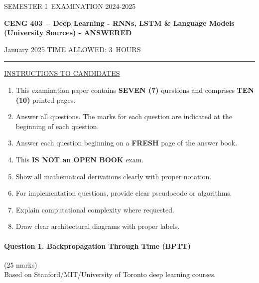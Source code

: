 \documentclass[12pt]{article}
\newcommand{\masunitnumber}{CENG 403}
\newcommand{\examdate}{January 2025}
\newcommand{\academicyear}{2024-2025}
\newcommand{\semester}{I}
\newcommand{\coursename}{Deep Learning - RNNs, LSTM \& Language Models (University Sources) - ANSWERED}
\newcommand{\numberofhours}{3}
\begin{document}
\setlength{\headsep}{5truemm}
\setlength{\headheight}{14.5truemm}
\setlength{\voffset}{-0.45truein}
\renewcommand{\headrulewidth}{0.0pt}
\begin{center}
SEMESTER \semester\ EXAMINATION \academicyear
\end{center}
\begin{center}
{\bf \masunitnumber\ -- \coursename}
\end{center}
\vspace{20truemm}
\noindent \examdate\hspace{45truemm} TIME ALLOWED: \numberofhours\ HOURS
\vspace{19truemm}
\hrule
\vspace{19truemm}
\noindent\underline{INSTRUCTIONS TO CANDIDATES}
\vspace{8truemm}
\begin{enumerate}
\item This examination paper contains {\bf SEVEN (7)} questions and comprises 
{\bf TEN (10)} printed pages.
\item Answer all questions. 
The marks for each question are indicated at the beginning of each question.
\item Answer each question beginning on a {\bf FRESH} page of the answer book.
\item This {\bf IS NOT an OPEN BOOK} exam.
\item Show all mathematical derivations clearly with proper notation.
\item For implementation questions, provide clear pseudocode or algorithms.
\item Explain computational complexity where requested.
\item Draw clear architectural diagrams with proper labels.
\end{enumerate}
\newpage
\lhead{}
\rhead{\masunitnumber}
\chead{}
\lfoot{}
\cfoot{\thepage}
\rfoot{}
\setlength{\footskip}{45pt}

\paragraph{Question 1. Backpropagation Through Time (BPTT)}\hfill (25 marks)\\
Based on Stanford/MIT/University of Toronto deep learning courses.
\end{document}
